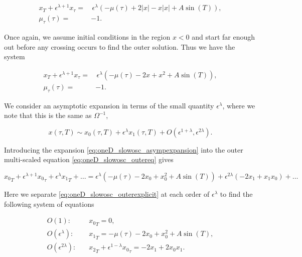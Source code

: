 \begin{equation*}
\begin{aligned}
x_T+\epsilon^{\lambda+1}x_\tau =&\, \epsilon^\lambda (-\mu(\tau)+2|x|-x|x|+A\sin(T)),\\
\mu_\tau(\tau)=&-1.
\end{aligned}
\end{equation*}

Once again, we assume initial conditions in the region $x<0$ and start far enough out before any crossing occurs to find the outer solution. Thus we have the system

\begin{equation}\label{eq:oneD_slowosc_outereq}
\begin{aligned}
x_T+\epsilon^{\lambda+1}x_\tau =& \, \epsilon^\lambda (-\mu(\tau)-2x+x^2+A\sin(T)),\\
\mu_\tau(\tau)=&-1.
\end{aligned}
\end{equation}

We consider an asymptotic expansion in terms of the small quantity $\epsilon^\lambda$, where we note that this is the same as $\Omega^{-1}$,

\begin{equation}\label{eq:oneD_slowosc_asympexpansion}
x(\tau,T)\sim x_0(\tau,T)+\epsilon^\lambda x_1(\tau,T)+O(\epsilon^{1+\lambda},\epsilon^{2\lambda}).
\end{equation}

Introducing the expansion \eqref{eq:oneD_slowosc_asympexpansion} into the outer multi-scaled equation \eqref{eq:oneD_slowosc_outereq} gives 

\begin{equation}\label{eq:oneD_slowosc_outerexplicit}
{x_0}_T+\epsilon^{\lambda+1}{x_0}_\tau+\epsilon^\lambda {x_1}_T+\ldots=\epsilon^\lambda(-\mu(\tau)-2x_0+x_0^2+A\sin(T))+\epsilon^{2\lambda}(-2x_1+x_1x_0)+\ldots
\end{equation}

Here we separate \eqref{eq:oneD_slowosc_outerexplicit} at each order of $\epsilon^\lambda$ to find the following system of equations

\begin{align}
\label{eq:oneD_slowosc_outerO1}
O(1):\quad & {x_0}_T=0, \\
\label{eq:oneD_slowosc_outerO2}
O(\epsilon^\lambda):\quad& {x_1}_T=-\mu(\tau)-2x_0+x_0^2+A\sin(T),\\
\label{eq:oneD_slowosc_outerO3}
O(\epsilon^{2\lambda}):\quad& {x_2}_T+\epsilon^{1-\lambda}{x_0}_\tau= -2x_1+2x_0x_1.
\end{align}

